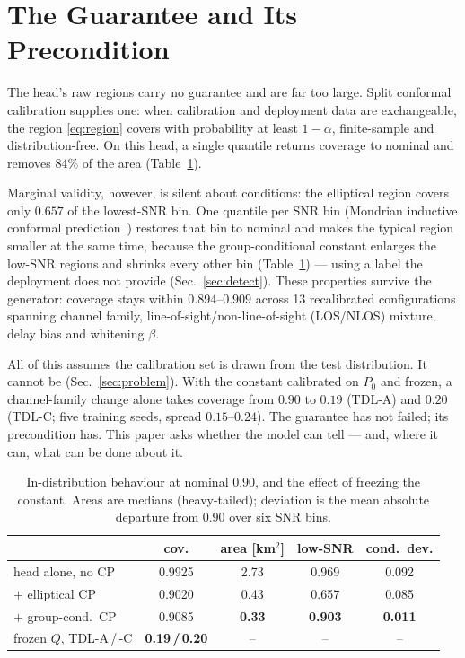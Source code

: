 \documentclass{article}
\begin{document}
\section{The Guarantee and Its Precondition}
\label{sec:guarantee}

The head's raw regions carry no guarantee and are far too large. Split
conformal calibration supplies one: when calibration and deployment
data are exchangeable, the region \eqref{eq:region} covers with
probability at least $1-\alpha$, finite-sample and
distribution-free. On this head, a single quantile returns coverage to
nominal and removes $84\%$ of the area (Table~\ref{tab:guarantee}).

Marginal validity, however, is silent about conditions: the elliptical
region covers only $0.657$ of the lowest-SNR bin. One quantile per SNR bin (Mondrian
inductive conformal prediction~\cite{vovk2012})
restores that bin to nominal and makes the typical region smaller at the
same time, because the group-conditional constant enlarges the low-SNR
regions and shrinks every other bin (Table~\ref{tab:guarantee}) --- using a
label the deployment does not provide (Sec.~\ref{sec:detect}). These
properties survive the generator: coverage stays within $0.894$--$0.909$
across 13 recalibrated configurations spanning channel family,
line-of-sight/non-line-of-sight (LOS/NLOS) mixture, delay bias and whitening $\beta$.

All of this assumes the calibration set is drawn from the test
distribution. It cannot be (Sec.~\ref{sec:problem}). With the constant
calibrated on $P_0$ and frozen, a channel-family change alone
takes coverage from $0.90$ to $0.19$ (TDL-A) and $0.20$ (TDL-C; five
training seeds, spread $0.15$--$0.24$). The guarantee has not failed; its
precondition has. This paper asks whether the model can tell ---
and, where it can, what can be done about it.

\begin{table}[t]
\caption{In-distribution behaviour at nominal 0.90, and the effect of
freezing the constant. Areas are medians (heavy-tailed); deviation is
the mean absolute departure from 0.90 over six SNR bins.}
\label{tab:guarantee}
\centering
\setlength{\tabcolsep}{2pt}
\begin{tabular}{lcccc}
\toprule
 & cov. & area [km$^2$] & low-SNR & cond.\ dev. \\
\midrule
head alone, no CP        & 0.9925 & 2.73 & 0.969 & 0.092 \\
$+$ elliptical CP        & 0.9020 & 0.43 & 0.657 & 0.085 \\
$+$ group-cond.\ CP      & 0.9085 & \textbf{0.33} & \textbf{0.903} & \textbf{0.011} \\
\midrule
frozen $Q$, TDL-A\,/\,-C & \textbf{0.19\,/\,0.20} & -- & -- & -- \\
\bottomrule
\end{tabular}
\end{table}
\end{document}
